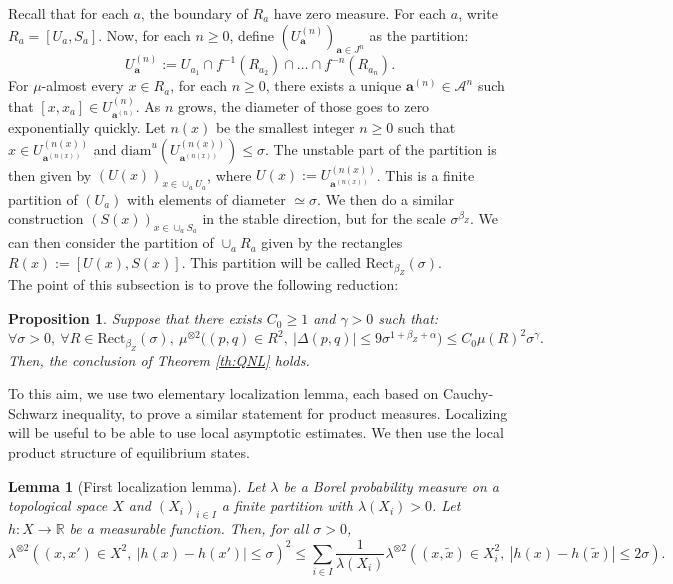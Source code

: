 \documentclass[a4paper]{article}
\newtheorem{lemma}[theorem]{Lemma}
\newtheorem{proposition}[theorem]{Proposition}
\theoremstyle{definition}
\begin{document}
Recall that for each $a$, the boundary of $R_a$ have zero measure. For each $a$, write $R_a = [U_a,S_a]$. Now, for each $n \geq 0$, define $({U^{(n)}_{\mathbf{a}} })_{\mathbf{a} \in J^n}$ as the partition:
$$ U^{(n)}_{\mathbf{a}} := U_{a_1} \cap f^{-1} (R_{a_2}) \cap \dots \cap f^{-n}(R_{a_n}).$$ For $\mu$-almost every $x \in R_a$, for each $n \geq 0$, there exists a unique $\mathbf{a}^{(n)} \in \mathcal{A}^n$ such that $[x,x_a] \in U_{\mathbf{a}^{(n)}}^{(n)}$. As $n$ grows, the diameter of those goes to zero exponentially quickly. Let $n(x)$ be the smallest integer $n \geq 0$ such that $x \in U_{\mathbf{a}^{(n(x))}}^{(n(x))}$ and $\text{diam}^u(U_{\mathbf{a}^{(n(x))}}^{(n(x))}) \leq \sigma$. The unstable part of the partition is then given by $(U(x))_{x \in \cup_a U_a}$, where $U(x) := U_{\mathbf{a}^{(n(x))}}^{(n(x))}$. This is a finite partition of $(U_a)$ with elements of diameter $\simeq \sigma$. We then do a similar construction $(S(x))_{x \in \cup_a S_a}$ in the stable direction, but for the scale $\sigma^{\beta_Z}$. We can then consider the partition of $\cup_a R_a$ given by the rectangles $R(x):=[U(x),S(x)]$. This partition will be called $\text{Rect}_{\beta_Z}(\sigma)$. \\

The point of this subsection is to prove the following reduction:

\begin{proposition}\label{prop:locQNL}
Suppose that there exists $C_0 \geq 1$ and $\gamma>0$ such that:
$$ \forall \sigma > 0, \ \forall R \in \text{Rect}_{\beta_Z}(\sigma), \ \mu^{\otimes 2}\Big( (p,q) \in R^2, \ |\Delta(p,q)| \leq 9 \sigma^{1+\beta_Z+\alpha} \Big) \leq C_0 \mu(R)^2 \sigma^\gamma. $$
Then, the conclusion of Theorem \ref{th:QNL} holds.
\end{proposition}

To this aim, we use two elementary localization lemma, each based on Cauchy-Schwarz inequality, to prove a similar statement for product measures. Localizing will be useful to be able to use local asymptotic estimates. We then use the local product structure of equilibrium states.


\begin{lemma}[First localization lemma]\label{lem:1loc}
Let $\lambda$ be a Borel probability measure on a topological space $X$ and $(X_i)_{i \in I}$ a finite partition with $\lambda(X_i) >0$. Let $h:X \rightarrow \mathbb{R}$ be a measurable function. Then, for all $\sigma>0$,
$$ \lambda^{\otimes 2}( (x,x') \in X^2, \ |h(x)-h(x')| \leq \sigma)^2 \leq \sum_{i \in I} \frac{1}{\lambda(X_i)} \lambda^{\otimes 2}( (x,\tilde{x}) \in X_i^2, \ |h(x)-h(\tilde{x})| \leq 2 \sigma).  $$
\end{lemma}
\end{document}
